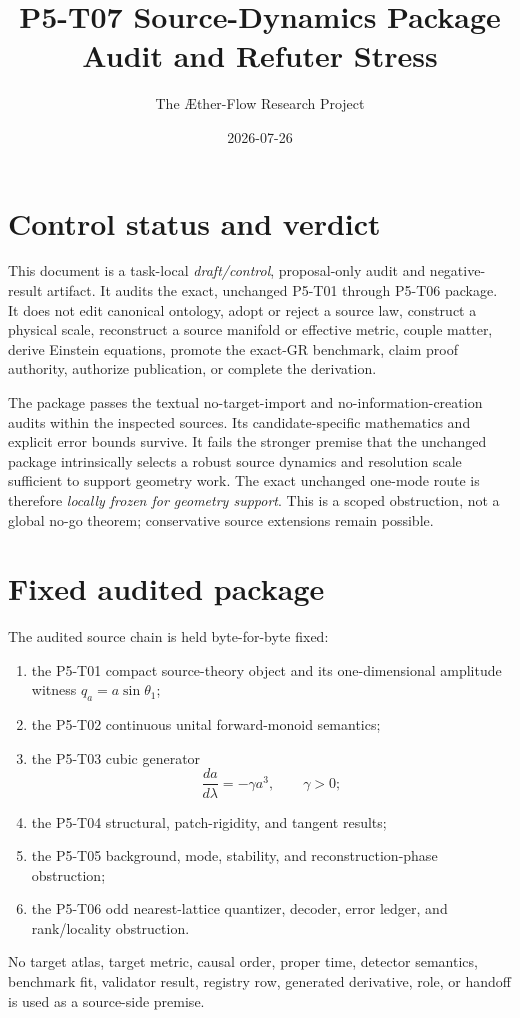 \documentclass[11pt]{article}
\title{P5-T07 Source-Dynamics Package Audit and Refuter Stress}
\author{The \AE ther-Flow Research Project}
\date{2026-07-26}
\begin{document}
\maketitle

\section*{Control status and verdict}

This document is a task-local \emph{draft/control}, proposal-only audit and
negative-result artifact.  It audits the exact, unchanged P5-T01 through
P5-T06 package.  It does not edit canonical ontology, adopt or reject a source
law, construct a physical scale, reconstruct a source manifold or effective
metric, couple matter, derive Einstein equations, promote the exact-GR
benchmark, claim proof authority, authorize publication, or complete the
derivation.

The package passes the textual no-target-import and no-information-creation
audits within the inspected sources.  Its candidate-specific mathematics and
explicit error bounds survive.  It fails the stronger premise that the
unchanged package intrinsically selects a robust source dynamics and
resolution scale sufficient to support geometry work.  The exact unchanged
one-mode route is therefore \emph{locally frozen for geometry support}.  This
is a scoped obstruction, not a global no-go theorem; conservative source extensions remain possible.

\section{Fixed audited package}

The audited source chain is held byte-for-byte fixed:
\begin{enumerate}
  \item the P5-T01 compact source-theory object and its one-dimensional
  amplitude witness \(q_a=a\sin\theta_1\);
  \item the P5-T02 continuous unital forward-monoid semantics;
  \item the P5-T03 cubic generator
  \[
      \frac{da}{d\lambda}=-\gamma a^3,\qquad \gamma>0;
  \]
  \item the P5-T04 structural, patch-rigidity, and tangent results;
  \item the P5-T05 background, mode, stability, and reconstruction-phase
  obstruction;
  \item the P5-T06 odd nearest-lattice quantizer, decoder, error ledger, and
  rank/locality obstruction.
\end{enumerate}
No target atlas, target metric, causal order, proper time, detector semantics,
benchmark fit, validator result, registry row, generated derivative, role, or
handoff is used as a source-side premise.
\end{document}
